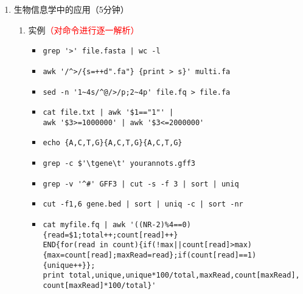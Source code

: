 \documentclass{TIJMUjiaoanLL}
\begin{document}
\begin{enumerate}
\begin{enumerate}
\begin{enumerate}
	  \item 实例
	    \begin{itemize}
	      \item \verb|awk '{print $0}' 123.txt|
	      \item \verb=ls -l | awk '{if($1 !~ /^d/) {print $0}}'=
	      \item \verb|awk '{printf("%03d %s\n",NR,$0)}' ori.txt > dst.txt|
	      \item \verb|awk 'BEGIN{FS=" ";OFS="\t"}{print $1,$2} ori.txt > dst.txt|
	    \end{itemize}
	  \vspace*{-10pt}
	    \begin{figure}[h]
	      \centering
	      \texttt{[image: c5\_awk\_01.jpg]}
	      \quad
	      \texttt{[image: c5\_awk\_02.jpg]}
	  \end{figure}
          \vspace*{-10pt}
	\end{enumerate}
    \end{enumerate}
  \item 生物信息学中的应用（5分钟）
    \begin{enumerate}
      \item  实例\textcolor{red}{（对命令进行逐一解析）}
	\begin{itemize}
          \item \verb=grep '>' file.fasta | wc -l=
	  \item \verb|awk '/^>/{s=++d".fa"} {print > s}' multi.fa|
          \item \verb|sed -n '1~4s/^@/>/p;2~4p' file.fq > file.fa|
          \item \verb~cat file.txt | awk '$1=="1"' |~ \\ \verb~awk '$3>=1000000' | awk '$3<=2000000'~
          \item \verb=echo {A,C,T,G}{A,C,T,G}{A,C,T,G}=
	  \item \verb|grep -c $'\tgene\t' yourannots.gff3|
          \item \verb~grep -v '^#' GFF3 | cut -s -f 3 | sort | uniq~
          \item \verb=cut -f1,6 gene.bed | sort | uniq -c | sort -nr=
          \item {\small \verb~cat myfile.fq | awk '((NR-2)%4==0){read=$1;total++;count[read]++}~ \\ \verb~END{for(read in count){if(!max||count[read]>max)~ \\ \verb~{max=count[read];maxRead=read};if(count[read]==1){unique++}};~ \\ \verb~print total,unique,unique*100/total,maxRead,count[maxRead],~ \\ \verb~count[maxRead]*100/total}'~}
	\end{itemize}
    \end{enumerate}


\end{enumerate}
\end{document}
